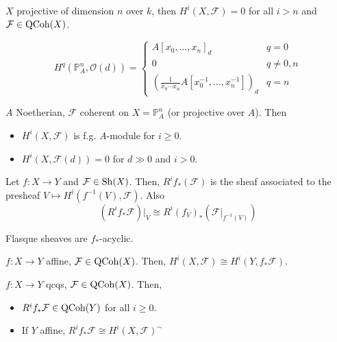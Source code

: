 \begin{proposition} $X$ projective of dimension $n$ over $k$, then $H^i(X, \mathcal{F}) = 0$ for all $i > n$ and $\mathcal{F} \in \operatorname{QCoh}(X)$.
\end{proposition}

\begin{theorem} 
\[
H^q (\mathbb{P}_A^{n}, \mathcal{O}(d)) = \begin{cases} 
    A[x_0, \ldots, x_n]_d & q = 0 \\
    0 & q \neq 0, n \\
    (\frac{1}{x_0 \cdots x_n} A[x_0^{-1}, \ldots, x_n^{-1}])_{d} & q = n
\end{cases}
\]
\end{theorem}


\begin{theorem} $A$ Noetherian, $\mathcal{F} $ coherent on $X = \mathbb{P}_A^n$ (or projective over $A$). Then
\begin{itemize}[topsep=-6pt, itemsep=0pt]
    \item $H^i(X, \mathcal{F})$ is f.g. $A$-module for $i \geq 0$.
    \item $H^i(X, \mathcal{F}(d)) = 0$ for $d \gg 0$ and $i > 0$. 
\end{itemize}
\end{theorem}

\begin{proposition} Let $f: X \to Y$ and $\mathcal{F} \in \operatorname{Sh}(X) $. Then, $R^if_*(\mathcal{F})$ is the sheaf associated to the presheaf $V \mapsto H^i(f^{-1}(V), \mathcal{F})$. Also
\[
(R^if_*\mathcal{F})|_V \cong R^i(f_V)_*(\mathcal{F}|_{f^{-1}(V)})
\]
\end{proposition}

\begin{proposition} Flasque sheaves are $f_*$-acyclic.
\end{proposition}

\begin{proposition} $f: X \to Y$ affine, $\mathcal{F} \in \operatorname{QCoh}(X)$. Then, $H^i(X, \mathcal{F}) \cong H^i(Y, f_*\mathcal{F})$.
\end{proposition}

\begin{proposition} $f : X \to  Y$ qcqs, $\mathcal{F} \in \operatorname{QCoh}(X)$. Then, 
\begin{itemize}[topsep=-6pt, itemsep=0pt]
    \item $R^if_*\mathcal{F} \in \operatorname{QCoh}(Y)$ for all $i \geq 0$.
    \item If $Y$ affine, $R^if_*\mathcal{F} \cong H^i(X, \mathcal{F})^{\sim}$ 
\end{itemize}
\end{proposition}

